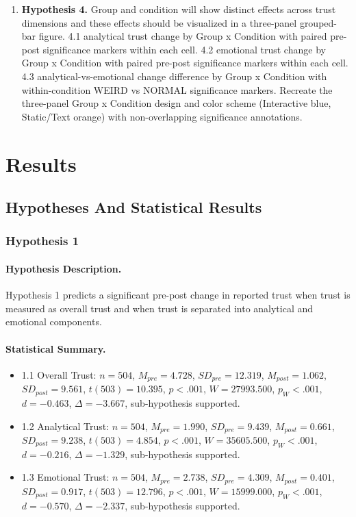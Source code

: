 \begin{enumerate}
\item \textbf{Hypothesis 4.} Group and condition will show distinct effects across trust dimensions and these effects should be visualized in a three-panel grouped-bar figure.
4.1 analytical trust change by Group x Condition with paired pre-post significance markers within each cell.
4.2 emotional trust change by Group x Condition with paired pre-post significance markers within each cell.
4.3 analytical-vs-emotional change difference by Group x Condition with within-condition WEIRD vs NORMAL significance markers.
Recreate the three-panel Group x Condition design and color scheme (Interactive blue, Static/Text orange) with non-overlapping significance annotations.
\end{enumerate}

\section{Results}
\subsection{Hypotheses And Statistical Results}

\subsubsection{Hypothesis 1}
\paragraph{Hypothesis Description.}
Hypothesis 1 predicts a significant pre-post change in reported trust when trust is measured as overall trust and when trust is separated into analytical and emotional components.

\paragraph{Statistical Summary.}
\begin{itemize}
\item 1.1 Overall Trust: $n=504$, $M_{pre}=4.728$, $SD_{pre}=12.319$, $M_{post}=1.062$, $SD_{post}=9.561$, $t(503)=10.395$, $p < .001$, $W=27993.500$, $p_{W} < .001$, $d=-0.463$, $\Delta=-3.667$, sub-hypothesis supported.
\item 1.2 Analytical Trust: $n=504$, $M_{pre}=1.990$, $SD_{pre}=9.439$, $M_{post}=0.661$, $SD_{post}=9.238$, $t(503)=4.854$, $p < .001$, $W=35605.500$, $p_{W} < .001$, $d=-0.216$, $\Delta=-1.329$, sub-hypothesis supported.
\item 1.3 Emotional Trust: $n=504$, $M_{pre}=2.738$, $SD_{pre}=4.309$, $M_{post}=0.401$, $SD_{post}=0.917$, $t(503)=12.796$, $p < .001$, $W=15999.000$, $p_{W} < .001$, $d=-0.570$, $\Delta=-2.337$, sub-hypothesis supported.
\end{itemize}


